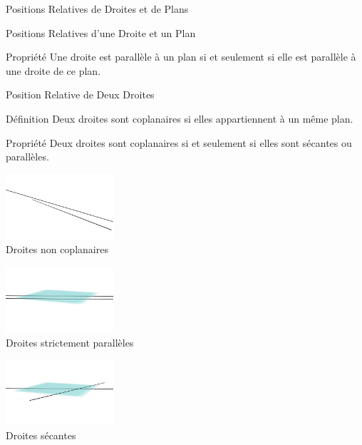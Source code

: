 \documentclass{coursbook}
\begin{document}
\begin{Gpartie}{Positions Relatives de Droites et de Plans}
\begin{Spartie}{Positions Relatives d'une Droite et un Plan}
\begin{center}
            \end{center}
            \begin{SSpartie}{Propriété} 
                Une droite est parallèle à un plan si et seulement si elle est parallèle à une droite de ce plan.
            \end{SSpartie}
        \end{Spartie}
        \begin{Spartie}{Position Relative de Deux Droites} 
            \begin{SSpartie}{Définition} 
                Deux droites sont coplanaires si elles appartiennent à un même plan.
            \end{SSpartie}
            \begin{SSpartie}{Propriété} 
                Deux droites sont coplanaires si et seulement si elles sont sécantes ou parallèles.
                \begin{center}
                    \begin{minipage}{4cm}\includegraphics[width=4cm]{rsc/11fig6a.png}\\ \centering Droites non coplanaires\end{minipage}
                    \begin{minipage}{4cm}\includegraphics[width=4cm]{rsc/11fig6b.png}\\ \centering Droites strictement parallèles\end{minipage} 
                    \begin{minipage}{4cm}\includegraphics[width=4cm]{rsc/11fig6c.png}\\ \centering Droites sécantes\end{minipage}

\end{center}
\end{SSpartie}
\end{Spartie}
\end{Gpartie}
\end{document}
